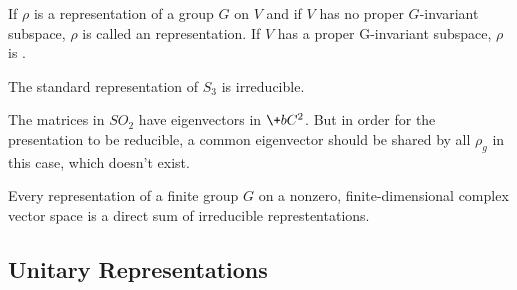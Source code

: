 \documentclass[hidelinks]{article}
\let\oldgloss\gloss
\def\gloss#1{\textnormal{\textbf{\oldgloss{#1}}}}
\begin{document}
\begin{definition}
    If $\rho$ is a representation of a group $G$ on $V$ and if $V$ has no proper $G$-invariant subspace, $\rho$ is called an  representation. If $V$ has a proper G-invariant subspace, $\rho$ is .
\end{definition}
The standard representation of $S_3$ is irreducible.
\begin{remark}
    The matrices in $SO_2$ have eigenvectors in $\+bC^2$. But in order for the presentation to be reducible, a common eigenvector should be shared by all $\rho_g$ in this case, which doesn't exist.
\end{remark}
\begin{resume}
\begin{theorem}[Maschke]
    Every representation of a finite group $G$ on a nonzero, finite-dimensional complex vector space is a direct sum of irreducible represtentations.
\end{theorem}
\end{resume}


\subsection{Unitary Representations} %
\label{sub:unitary_representations}
\end{document}
